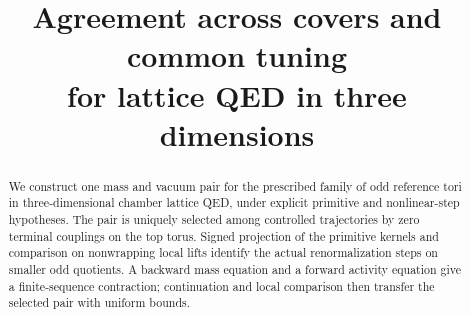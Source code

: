 \documentclass[11pt,letterpaper,reqno]{amsart}
\title[Agreement across covers and common tuning]{Agreement across covers and common tuning\\for lattice QED in three dimensions}
\date{}
\begin{document}
\begin{abstract}
We construct one mass and vacuum pair for the prescribed family of odd
reference tori in three-dimensional chamber lattice QED, under explicit
primitive and nonlinear-step hypotheses. The pair is uniquely selected
among controlled trajectories by zero terminal couplings on the top
torus. Signed projection of the primitive kernels and comparison on
nonwrapping local lifts identify the actual renormalization steps on
smaller odd quotients. A backward mass equation and a forward activity
equation give a finite-sequence contraction; continuation and local
comparison then transfer the selected pair with uniform bounds.
\end{abstract}
\maketitle
\tableofcontents







\appendix

\printbibliography
\end{document}

